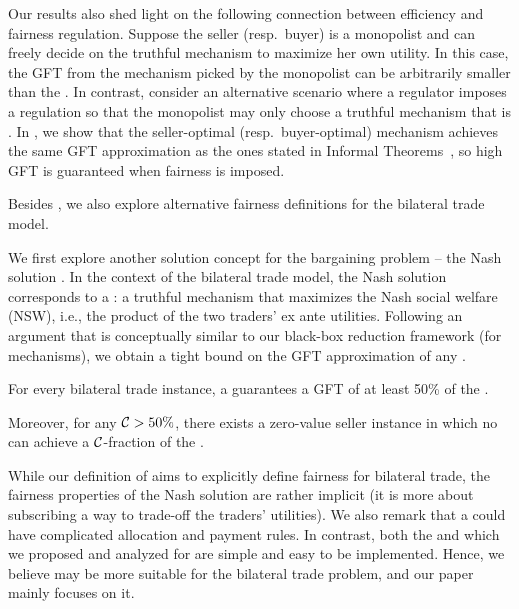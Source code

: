 Our results also shed light on the following connection between efficiency and fairness regulation. Suppose the seller (resp.\ buyer) is a monopolist and can freely decide on the truthful mechanism to maximize her own utility. In this case, the GFT from the mechanism picked by the monopolist can be arbitrarily smaller than the {\SecondBest}. In contrast, consider an alternative scenario where a regulator imposes a regulation so that the monopolist may only choose a truthful mechanism that is {\ksfair}. In , we show that the seller-optimal (resp.\ buyer-optimal) {\ksfair} mechanism achieves the same GFT approximation as the ones stated in Informal Theorems~, so high GFT is guaranteed when fairness is imposed.


 Besides {\ksfairness}, we also explore alternative fairness definitions for the bilateral trade model.

We first explore another solution concept for the bargaining problem -- the Nash solution \citep{nash-51}. In the context of the bilateral trade model, the Nash solution corresponds to a {\NashSocialWelfareMaximizer}: a truthful mechanism that maximizes the Nash social welfare (NSW), i.e., the product of the two traders' ex ante utilities. Following an argument that is conceptually similar to our black-box reduction framework (for {\ksfair} mechanisms), we obtain a tight bound on the GFT approximation of any {\NashSocialWelfareMaximizer}.

\begin{informal}
    For every bilateral trade instance, a {\NashSocialWelfareMaximizer} guarantees a GFT of at least 50\% of the {\SecondBest}.

    Moreover, for any $\mathcal{C} > 50\%$, there exists a zero-value seller instance in which no {\NashSocialWelfareMaximizer} can achieve a
    $\mathcal{C}$-fraction of the {\SecondBest}.
\end{informal}
While our definition of {\ksfairness} aims to explicitly define fairness for bilateral trade, the  fairness properties of the Nash solution are rather implicit (it is more about subscribing a way to trade-off the traders' utilities). We also remark that a {\NashSocialWelfareMaximizer} could have complicated allocation and payment rules. In contrast, both the {\BiasedRandomOffer} and {\FixPrice} which we proposed and analyzed for {\ksfairness} are simple and easy to be implemented. Hence, we believe {\ksfairness} may be more suitable for the bilateral trade problem, and our paper mainly focuses on it.


